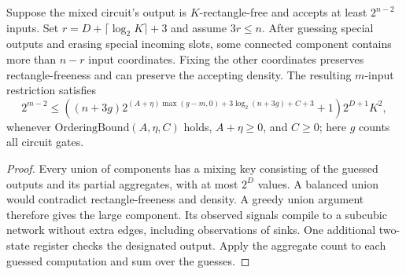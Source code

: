 \begin{theorem}
  \label{thm:lowerbounds-algebraic-aggregate-component}
  \leanok
  Suppose the mixed circuit's output is $K$-rectangle-free and accepts at
  least $2^{n-2}$ inputs. Set $r=D+\lceil\log_2 K\rceil+3$ and assume $3r\le n$.
  After guessing special outputs and erasing special incoming slots, some
  connected component contains more than $n-r$ input coordinates.
  Fixing the other coordinates preserves rectangle-freeness and can preserve
  the accepting density. The resulting $m$-input restriction satisfies
  \[
    2^{m-2}\le
    \left((n+3g)2^{(A+\eta)\max(g-m,0)+3\log_2(n+3g)+C+3}+1\right)
       2^{D+1}K^2,
  \]
  whenever $\mathrm{OrderingBound}(A,\eta,C)$ holds, $A+\eta\ge0$, and $C\ge0$;
  here $g$ counts all circuit gates.
\end{theorem}
\begin{proof}
  \leanok
  Every union of components has a mixing key consisting of the guessed
  outputs and its partial aggregates, with at most $2^D$ values. A balanced
  union would contradict rectangle-freeness and density. A greedy union
  argument therefore gives the large component. Its observed signals compile
  to a subcubic network without extra edges, including observations of sinks.
  One additional two-state register checks the designated output. Apply the
  aggregate count to each guessed computation and sum over the guesses.
\end{proof}

